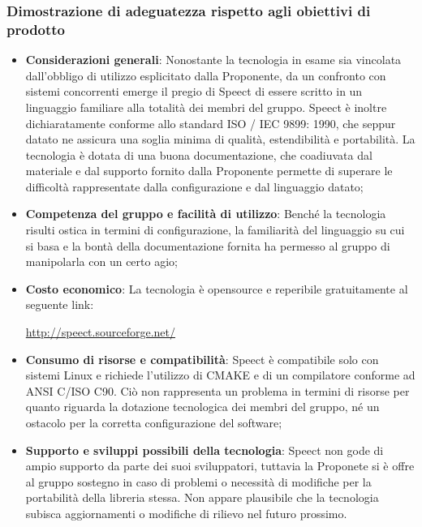 \documentclass[./../Technology Baseline.tex]{subfiles}
\begin{document}
\subsubsection{Dimostrazione di adeguatezza rispetto agli obiettivi di prodotto}
\begin{itemize}
	\item \textbf{Considerazioni generali}: Nonostante la tecnologia in esame sia vincolata dall'obbligo di utilizzo esplicitato dalla Proponente, da un confronto con sistemi concorrenti emerge il pregio di Speect di essere scritto in un linguaggio familiare alla totalità dei membri del gruppo. Speect è inoltre dichiaratamente conforme allo standard ISO / IEC 9899: 1990, che seppur datato ne assicura una soglia minima di qualità, estendibilità e portabilità. La tecnologia è dotata di una buona documentazione, che coadiuvata dal materiale e dal supporto fornito dalla Proponente permette di superare le difficoltà rappresentate dalla configurazione e dal linguaggio datato;
	
	\item \textbf{Competenza del gruppo e facilità di utilizzo}: Benché la tecnologia risulti ostica in termini di configurazione, la familiarità del linguaggio su cui si basa e la bontà della documentazione fornita ha permesso al gruppo di manipolarla con un certo agio;
	
	\item \textbf{Costo economico}: La tecnologia è opensource e reperibile gratuitamente al seguente link:
	\begin{center}
		\url{http://speect.sourceforge.net/}
	\end{center}

	\item \textbf{Consumo di risorse e compatibilità}: Speect è compatibile solo con sistemi Linux e richiede l'utilizzo di CMAKE e di un compilatore conforme ad ANSI C/ISO C90. Ciò non rappresenta un problema in termini di risorse per quanto riguarda la dotazione tecnologica dei membri del gruppo, né un ostacolo per la corretta configurazione del software;
	
	\item \textbf{Supporto e sviluppi possibili della tecnologia}: Speect non gode di ampio supporto da parte dei suoi sviluppatori, tuttavia la Proponete si è offre al gruppo sostegno in caso di problemi o necessità di modifiche per la portabilità della libreria stessa. Non appare plausibile che la tecnologia subisca aggiornamenti o modifiche di rilievo nel futuro prossimo.
\end{itemize}
\end{document}
